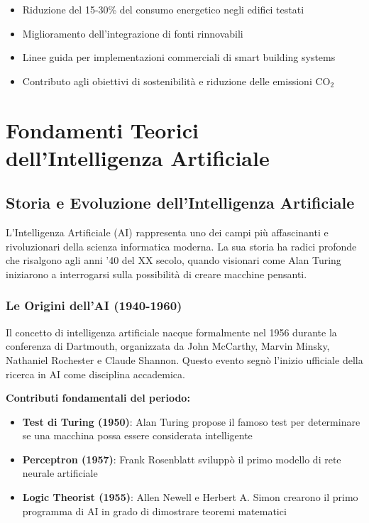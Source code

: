 \documentclass[12pt,a4paper,twoside]{report}
\begin{document}
\begin{itemize}
    \item Riduzione del 15-30\% del consumo energetico negli edifici testati
    \item Miglioramento dell'integrazione di fonti rinnovabili
    \item Linee guida per implementazioni commerciali di smart building systems
    \item Contributo agli obiettivi di sostenibilità e riduzione delle emissioni CO$_2$
\end{itemize}


\chapter{Fondamenti Teorici dell'Intelligenza Artificiale}

\section{Storia e Evoluzione dell'Intelligenza Artificiale}

L'Intelligenza Artificiale (AI) rappresenta uno dei campi più affascinanti e rivoluzionari della scienza informatica moderna. La sua storia ha radici profonde che risalgono agli anni '40 del XX secolo, quando visionari come Alan Turing iniziarono a interrogarsi sulla possibilità di creare macchine pensanti.

\subsection{Le Origini dell'AI (1940-1960)}

Il concetto di intelligenza artificiale nacque formalmente nel 1956 durante la conferenza di Dartmouth, organizzata da John McCarthy, Marvin Minsky, Nathaniel Rochester e Claude Shannon. Questo evento segnò l'inizio ufficiale della ricerca in AI come disciplina accademica.

\textbf{Contributi fondamentali del periodo:}
\begin{itemize}
    \item \textbf{Test di Turing (1950)}: Alan Turing propose il famoso test per determinare se una macchina possa essere considerata intelligente
    \item \textbf{Perceptron (1957)}: Frank Rosenblatt sviluppò il primo modello di rete neurale artificiale
    \item \textbf{Logic Theorist (1955)}: Allen Newell e Herbert A. Simon crearono il primo programma di AI in grado di dimostrare teoremi matematici
\end{itemize}
\end{document}
